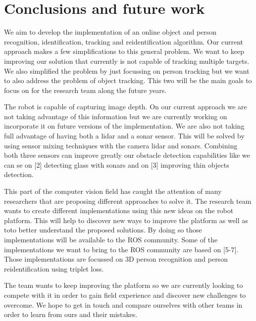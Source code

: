 \section{Conclusions and future work}
We aim to develop the implementation of an online object and person recognition, identification, tracking and reidentification algorithm.
Our current approach makes a few simplifications to this general problem.
We want to keep improving our solution that currently is not capable of tracking multiple targets.
We also simplified the problem by just focussing on person tracking but we want to also address the problem of object tracking.
This two will be the main goals to focus on for the research team along the future years.

The robot is capable of capturing image depth.
On our current approach we are not taking advantage of this information but we are currently working on incorporate it on future versions of the implementation.
We are also not taking full advantage of having both a lidar and a sonar sensor.
This will be solved by using sensor mixing techniques with the camera lidar and sonars.
Combining both three sensors can improve greatly our obstacle detection capabilities like we can se on [2] detecting glass with sonars and on [3] improving thin objects detection. 

This part of the computer vision field has caught the attention of many researchers that are proposing different approaches to solve it.
The research team wants to create different implementations using this new ideas on the robot platform.
This will help to discover new ways to improve the platform as well as toto better understand the proposed solutions.
By doing so those implementations will be available to the ROS community.
Some of the implementations we want to bring to the ROS community are based on [5-7].
Those implementations are focussed on 3D person recognition and person reidentification using triplet loss.

The team wants to keep improving the platform so we are currently looking to compete with it in order to gain field experience and discover new challenges to overcome.
We hope to get in touch and compare ourselves with other teams in order to learn from ours and their mistakes.

\newpage



\newpage
\robospecs

\nocite{*}

